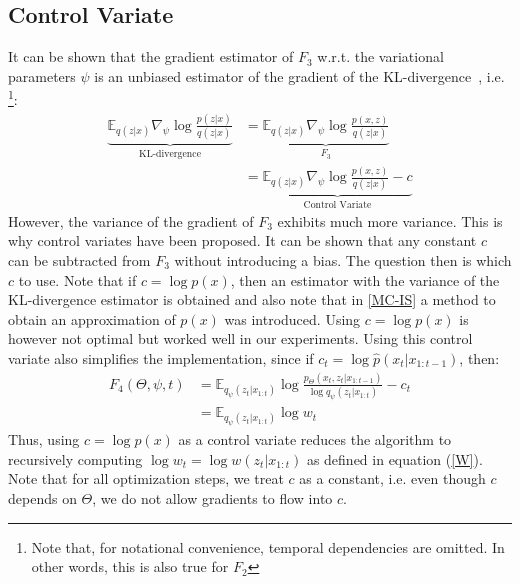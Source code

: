 \subsection{Control Variate}
It can be shown that the gradient estimator of $F_3$ w.r.t. the variational parameters $\psi$ is an unbiased estimator of the gradient of the KL-divergence~\cite{mnih2014neural}, i.e. \footnote{Note that, for notational convenience, temporal dependencies are omitted. In other words, this is also true for $F_2$}:
\begin{align*}
\underbrace{\mathbb E_{q(z | x)} \nabla_\psi  \log \frac{p(z|x)}{q(z|x)}}_{\text{KL-divergence}} &= \underbrace{\mathbb E_{q(z | x)} \nabla_\psi  \log \frac{p(x,z)}{q(z|x)}}_{F_3} \\
 &= \underbrace{\mathbb E_{q(z | x)} \nabla_\psi  \log \frac{p(x,z)}{q(z|x)} - c}_{\text{Control Variate}}
\end{align*} 
However, the variance of the gradient of $F_3$ exhibits much more variance. This is why control variates have been proposed. It can be shown that any constant $c$ can be subtracted from $F_3$ without introducing a bias. The question then is which $c$ to use. Note that if $c=\log p(x)$, then an estimator with the variance of the KL-divergence estimator is obtained and also note that in \ref{MC-IS} a method to obtain an approximation of $p(x)$ was introduced. Using $c=\log p(x)$ is however not optimal but worked well in our experiments. Using this control variate also simplifies the implementation, since if $c_t = \log \hat{p}(x_t | x_{1:t-1})$, then:
\begin{align*}
F_{4}(\Theta, \psi, t)&= \mathbb{E}_{q_\psi(z_t|x_{1:t})} \log \frac{p_\Theta(x_t,z_t|x_{1:t-1})}{ \log q_\psi(z_t|x_{1:t})} - c_t\\
&= \mathbb{E}_{q_\psi(z_t|x_{1:t})} \log w_t
\end{align*}
Thus, using $c=\log p(x)$ as a control variate reduces the algorithm to recursively computing $\log w_t = \log w(z_t|x_{1:t})$ as defined in equation (\ref{W}). Note that for all optimization steps, we treat $c$ as a constant, i.e. even though $c$ depends on $\Theta$, we do not allow gradients to flow into $c$.\\

